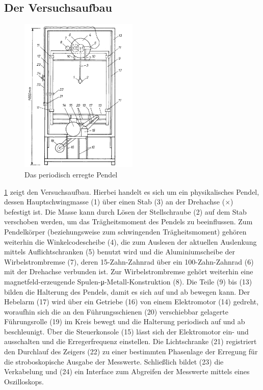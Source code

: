 \documentclass[numbers=noenddot,12pt,a4paper]{scrartcl}
\newcommand{\greek}[1]{\greektext#1\latintext}
\begin{document}
\subsection{Der Versuchsaufbau}\label{ch2.1}
\begin{figure}
	\centering
	\vspace{-2em}
	\includegraphics[width=0.5\textwidth]{pendel.png}
	\caption{Das periodisch erregte Pendel}
	\label{img:pererpen}
\end{figure}
\ref{img:pererpen} zeigt den Versuchsaufbau. Hierbei handelt es sich um ein physikalisches Pendel, dessen Hauptschwingmasse (1) über einen Stab (3) an der Drehachse ($\times$) befestigt ist. Die Masse kann durch Lösen der Stellschraube (2) auf dem Stab verschoben werden, um das Trägheitsmoment des Pendels zu beeinflussen. Zum Pendelkörper (beziehungsweise zum schwingenden Trägheitsmoment) gehören weiterhin die Winkelcodescheibe (4), die zum Auslesen der aktuellen Auslenkung mittels Auflichtschranken (5) benutzt wird und die Aluminiumscheibe der Wirbelstrombremse (7), deren 15-Zahn-Zahnrad über ein 100-Zahn-Zahnrad (6) mit der Drehachse verbunden ist. Zur Wirbelstrombremse gehört weiterhin eine magnetfeld-erzeugende Spulen-\greek{μ}-Metall-Konstruktion (8). Die Teile (9) bis (13) bilden die Halterung des Pendels, damit es sich auf und ab bewegen kann. Der Hebelarm (17) wird über ein Getriebe (16) von einem Elektromotor (14) gedreht, woraufhin sich die an den Führungsschienen (20) verschiebbar gelagerte Führungsrolle (19) im Kreis bewegt und die Halterung periodisch auf und ab beschleunigt. Über die Steuerkonsole (15) lässt sich der Elektromotor ein- und ausschalten und die Erregerfrequenz einstellen. Die Lichtschranke (21) registriert den Durchlauf des Zeigers (22) zu einer bestimmten Phasenlage der Erregung für die stroboskopische Ausgabe der Messwerte. Schließlich bildet (23) die Verkabelung und (24) ein Interface zum Abgreifen der Messwerte mittels eines Oszilloskops.\\
\end{document}
